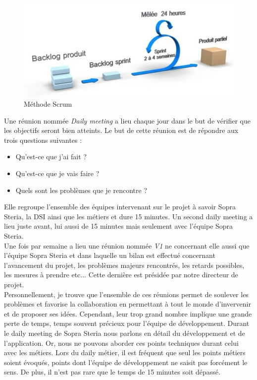 \begin{figure}[h!]
	\includegraphics[scale=0.7]{images/travailBP1818/scrum.jpg}
	\centering
	\caption{Méthode Scrum}
	\label{scrum}
\end{figure}

	Une réunion nommée \textit{Daily meeting} a lieu chaque jour dans le but de vérifier que les objectifs seront bien atteints. Le but de cette réunion est de répondre aux trois questions suivantes : 
	\begin{itemize}
		\item Qu'est-ce que j'ai fait ?
		\item Qu'est-ce que je vais faire ?
		\item Quels sont les problèmes que je rencontre ?
	\end{itemize}
	Elle regroupe l'ensemble des équipes intervenant sur le projet à savoir Sopra Steria, la DSI ainsi que les métiers et dure 15 minutes. Un second daily meeting a lieu juste avant, lui aussi de 15 minutes mais seulement avec l'équipe Sopra Steria. \\

	Une fois par semaine a lieu une réunion nommée \textit{V1} ne concernant elle aussi que l'équipe Sopra Steria et dans laquelle un bilan est effectué concernant l'avancement du projet, les problèmes majeurs rencontrés, les retards possibles, les mesures à prendre etc... Cette dernière est présidée par notre directeur de projet. \\
	
	Personnellement, je trouve que l'ensemble de ces réunions permet de soulever les problèmes et favorise la collaboration en permettant à tout le monde d'invervenir et de proposer ses idées. Cependant, leur trop grand nombre implique une grande perte de temps, temps souvent précieux pour l'équipe de développement. Durant le daily meeting de Sopra Steria nous parlons en détail du développement et de l'application. Or, nous ne pouvons aborder ces points techniques durant celui avec les métiers. Lors du daily métier, il est fréquent que seul les points métiers soient évoqués, points dont l'équipe de développement ne saisit pas forcément le sens. De plus, il n'est pas rare que le temps de 15 minutes soit dépassé. \\
	

